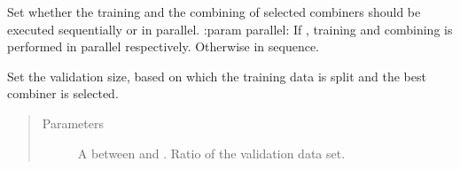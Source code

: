 \documentclass[letterpaper,10pt,english]{sphinxmanual}
\begin{document}
\begin{fulllineitems}
\begin{fulllineitems}
\begin{quote}
\begin{description}
\end{description}\end{quote}

\end{fulllineitems}


\begin{fulllineitems}
\label{\detokenize{pusion.auto.auto_combiner:pusion.auto.auto_combiner.AutoCombiner.set_parallel}}
\sphinxAtStartPar
Set whether the training and the combining of selected combiners should be executed sequentially or in parallel.
:param parallel: If , training and combining is performed in parallel respectively. Otherwise in sequence.

\end{fulllineitems}


\begin{fulllineitems}
\label{\detokenize{pusion.auto.auto_combiner:pusion.auto.auto_combiner.AutoCombiner.set_validation_size}}
\sphinxAtStartPar
Set the validation size, based on which the training data is split and the best combiner is selected.
\begin{quote}\begin{description}
\item[{Parameters}] \leavevmode
\sphinxAtStartPar
{} \textendash{} A  between  and . Ratio of the validation data set.

\end{description}\end{quote}

\end{fulllineitems}



\end{fulllineitems}
\end{document}
